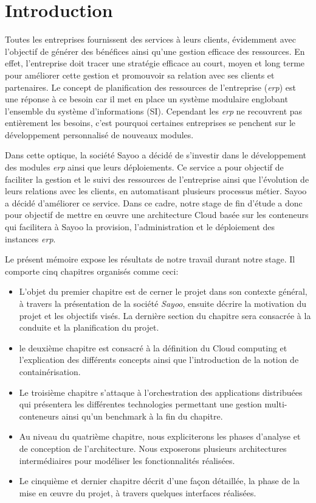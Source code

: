 \chapter*{Introduction}

\begin{onehalfspace}
Toutes les entreprises fournissent des services à leurs clients, évidemment avec l'objectif de générer des bénéfices ainsi qu'une gestion efficace des ressources. En effet, l'entreprise doit tracer une stratégie efficace au court, moyen et long terme pour améliorer cette gestion  et promouvoir sa relation avec ses clients et partenaires. Le concept de planification des ressources de l'entreprise (\emph{\acrshort{erp}}) est une réponse à ce besoin  car il met en place un système modulaire englobant l'ensemble du système d'informations (SI). Cependant les \emph{\acrshort{erp}} ne recouvrent pas entièrement les besoins, c'est pourquoi certaines entreprises se penchent sur le développement personnalisé de nouveaux modules. 


Dans cette optique, la société Sayoo a décidé de s'investir dans le développement des modules \emph{\acrshort{erp}} ainsi que leurs déploiements. Ce service a pour objectif de faciliter la gestion et le suivi des ressources de l'entreprise ainsi que l'évolution de leurs relations avec les clients, en automatisant plusieurs processus métier. Sayoo a décidé d'améliorer ce service. Dans ce cadre, notre stage de fin d'étude a donc pour objectif de mettre en œuvre une architecture Cloud basée sur les conteneurs qui facilitera à Sayoo la provision, l'administration et le déploiement des instances \emph{\acrshort{erp}}.


Le présent mémoire expose les résultats de notre travail durant notre stage. Il comporte cinq chapitres organisés comme ceci:
\begin{itemize}
\item L'objet du premier chapitre est de cerner le projet dans son contexte général, à travers la présentation de la société \emph{Sayoo}, ensuite décrire la motivation du projet et les objectifs visés. La dernière section du chapitre sera consacrée à la conduite et la planification du projet.
\item le deuxième chapitre est consacré à la définition du Cloud computing et l'explication des différents concepts ainsi que l'introduction de la notion de containérisation. 
\item Le troisième chapitre s'attaque à l'orchestration des applications distribuées qui présentera les différentes technologies permettant une gestion multi-conteneurs ainsi qu'un benchmark à la fin du chapitre.
\item Au niveau du quatrième chapitre, nous expliciterons les phases d'analyse et de conception de l'architecture. Nous exposerons plusieurs architectures intermédiaires pour modéliser les fonctionnalités réalisées.
\item Le cinquième et dernier chapitre décrit d'une façon détaillée, la phase de la mise en œuvre du projet, à travers quelques interfaces réalisées.
\end{itemize}


\end{onehalfspace}
